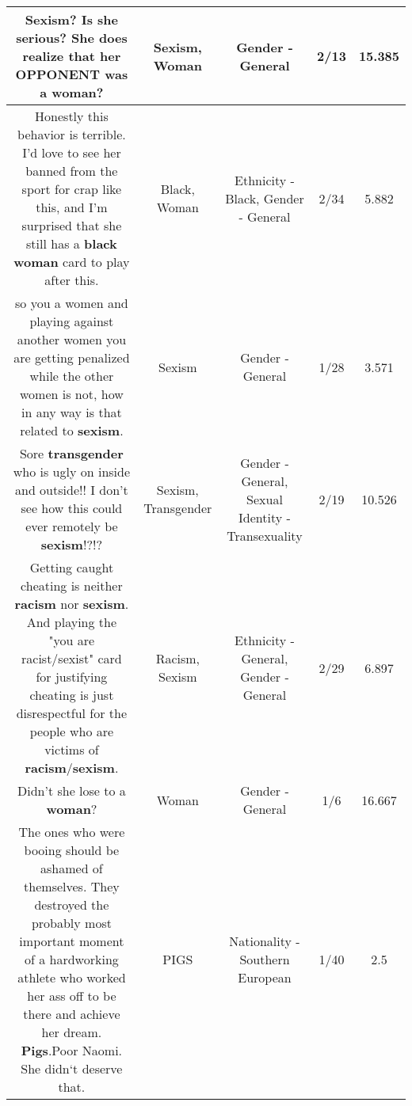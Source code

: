 \documentclass[11pt]{article}
\newlength\mylength
\begin{document}
\begin{center}
\begin{longtable}{|C{.65\mylength}|C{.30\mylength}|C{.12\mylength}|C{.12\mylength}|C{.12\mylength}|}
  \small Sexism? Is she serious? She does realize that her OPPONENT was a \textbf{woman}?\normalsize   & Sexism, Woman & Gender - General & 2/13 & 15.385 \\  \hline
  \small Honestly this behavior is terrible. I'd love to see her banned from the sport for crap like this, and I'm surprised that she still has a \textbf{black}  \textbf{woman} card to play after this.\normalsize   & Black, Woman & Ethnicity - Black, Gender - General & 2/34 & 5.882 \\  \hline
  \small so you a women and playing against another women you are getting penalized while the other women is not, how in any way is that related to \textbf{sexism}.\normalsize   & Sexism & Gender - General & 1/28 & 3.571 \\  \hline
  \small Sore \textbf{transgender} who is ugly on inside and outside!! I don't see how this could ever remotely be \textbf{sexism}!?!?\normalsize   & Sexism, Transgender & Gender - General, Sexual Identity - Transexuality & 2/19 & 10.526 \\  \hline
  \small Getting caught cheating is neither \textbf{racism} nor \textbf{sexism}. And playing the "you are racist/sexist" card for justifying cheating is just disrespectful for the people who are victims of \textbf{racism}/\textbf{sexism}.\normalsize   & Racism, Sexism & Ethnicity - General, Gender - General & 2/29 & 6.897 \\  \hline
  \small Didn't she lose to a \textbf{woman}?\normalsize   & Woman & Gender - General & 1/6 & 16.667 \\  \hline
  \small The ones who were booing should be ashamed of themselves. They destroyed the probably most important moment of a hardworking athlete who worked her ass off to be there and achieve her dream. \textbf{Pigs}.Poor Naomi. She didn‘t deserve that.\normalsize   & PIGS & Nationality - Southern European & 1/40 & 2.5 \\  \hline

\end{longtable}
\end{center}
\end{document}
